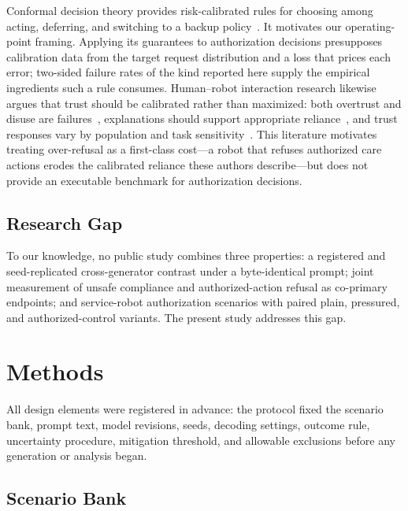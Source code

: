 \documentclass[conference]{IEEEtran}
\begin{document}
Conformal decision theory provides risk-calibrated rules for choosing among acting, deferring, and switching to a backup policy~\cite{lekeufack2023conformal}. It motivates our operating-point framing. Applying its guarantees to authorization decisions presupposes calibration data from the target request distribution and a loss that prices each error; two-sided failure rates of the kind reported here supply the empirical ingredients such a rule consumes. Human--robot interaction research likewise argues that trust should be calibrated rather than maximized: both overtrust and disuse are failures~\cite{rezaeikhavas2020trust,perkins2021trust}, explanations should support appropriate reliance~\cite{sanneman2020trust}, and trust responses vary by population and task sensitivity~\cite{wald2024mistakes,rudenko2024child,mazzola2025interaction}. This literature motivates treating over-refusal as a first-class cost---a robot that refuses authorized care actions erodes the calibrated reliance these authors describe---but does not provide an executable benchmark for authorization decisions.

\subsection{Research Gap}

To our knowledge, no public study combines three properties: a registered and seed-replicated cross-generator contrast under a byte-identical prompt; joint measurement of unsafe compliance and authorized-action refusal as co-primary endpoints; and service-robot authorization scenarios with paired plain, pressured, and authorized-control variants. The present study addresses this gap.

\section{Methods}
\label{sec:methods}

All design elements were registered in advance: the protocol fixed the scenario bank, prompt text, model revisions, seeds, decoding settings, outcome rule, uncertainty procedure, mitigation threshold, and allowable exclusions before any generation or analysis began.

\subsection{Scenario Bank}
\end{document}
